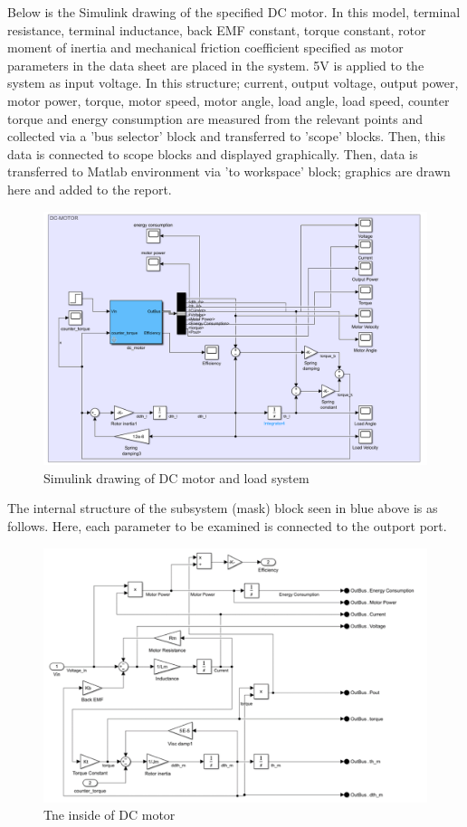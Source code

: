             Below is the Simulink drawing of the specified DC motor. In this model, terminal resistance, terminal inductance, back EMF constant, torque constant, rotor moment of inertia and mechanical friction coefficient specified as motor parameters in the data sheet are placed in the system. 5V is applied to the system as input voltage. In this structure; current, output voltage, output power, motor power, torque, motor speed, motor angle, load angle, load speed, counter torque and energy consumption are measured from the relevant points and collected via a 'bus selector' block and transferred to 'scope' blocks. Then, this data is connected to scope blocks and displayed graphically. Then, data is transferred to Matlab environment via 'to workspace' block; graphics are drawn here and added to the report.
            
    \begin{figure}[H]
        \centering
        \includegraphics[width=0.8\columnwidth]{imgs/Simulink drawing of DC motor and load system.png}
        \caption[Short description for list of figures]{Simulink drawing of DC motor and load system }
        \label{fig-magnitude}
        \end{figure}%

        The internal structure of the subsystem (mask) block seen in blue above is as follows. Here, 
each parameter to be examined is connected to the outport port. 

\begin{figure}[H]
    \centering
    \includegraphics[width=0.8\columnwidth]{imgs/Tne inside of DC motor.png}
    \caption[Short description for list of figures]{Tne inside of DC motor }
    \label{fig-magnitude}
    \end{figure}%

